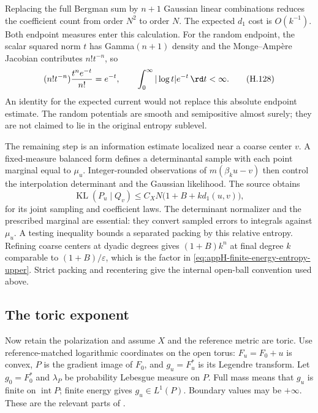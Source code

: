 Replacing the full Bergman sum by $n+1$ Gaussian linear combinations
reduces the coefficient count from order $N^2$ to order $N$.
The expected $d_1$ cost is $O(k^{-1})$. Both endpoint measures enter
this calculation. For the random endpoint, the scalar squared norm
$t$ has Gamma$(n+1)$ density and the Monge--Amp\`ere Jacobian
contributes $n!t^{-n}$, so
\[
        (n!t^{-n})\frac{t^ne^{-t}}{n!}=e^{-t},
        \qquad \int_0^\infty |\log t|e^{-t}\,\rd t<\infty.
 \tag{H.128}\label{eq:appH-entropy-Gaussian-endpoint}
\]
An identity for the expected current would not replace this absolute
endpoint estimate. The random potentials are smooth and semipositive
almost surely; they are not claimed to lie in the original entropy
sublevel.

The remaining step is an information estimate localized near a coarse
center $v$. A fixed-measure balanced form defines a determinantal
sample with each point marginal equal to $\mu_u$. Integer-rounded
observations of $m(\beta_ku-v)$ then control the interpolation
determinant and the Gaussian likelihood. The source obtains
\[
       \operatorname{KL}(P_u\mid Q_v)
          \leq C_XN\bigl(1+B+k d_1(u,v)\bigr),
\]
for its joint sampling and coefficient laws. The determinant
normalizer and the prescribed marginal are essential: they convert
sampled errors to integrals against $\mu_u$. A testing inequality
bounds a separated packing by this relative entropy. Refining coarse
centers at dyadic degrees gives
$(1+B)k^n$ at final degree $k$ comparable to $(1+B)/\varepsilon$,
which is the factor in
\eqref{eq:appH-finite-energy-entropy-upper}. Strict packing and
recentering give the internal open-ball convention used above.

\subsection{The toric exponent}

Now retain the polarization and assume $X$ and the reference metric
are toric. Use reference-matched logarithmic coordinates on the open
torus: $F_u=F_0+u$ is convex, $P$ is the gradient image of $F_0$,
and $g_u=F_u^*$ is its Legendre transform. Let $g_0=F_0^*$ and
$\lambda_P$ be probability Lebesgue measure on $P$.
Full mass means that $g_u$ is finite on $\operatorname{int}P$;
finite energy gives $g_u\in L^1(P)$. Boundary values may be
$+\infty$. These are the relevant parts of
\cite[Theorem~3.6 and Proposition~3.9]{CGSZ18ToricV1}.


